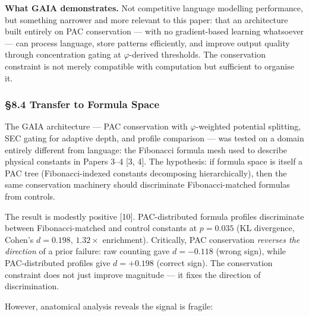 \documentclass[
  11pt,
  a4paper]{article}
\begin{document}
\textbf{What GAIA demonstrates.} Not competitive language modelling
performance, but something narrower and more relevant to this paper:
that an architecture built entirely on PAC conservation --- with no
gradient-based learning whatsoever --- can process language, store
patterns efficiently, and improve output quality through concentration
gating at \(\varphi\)-derived thresholds. The conservation constraint is
not merely compatible with computation but sufficient to organise it.

\subsubsection{§8.4 Transfer to Formula
Space}\label{transfer-to-formula-space}

The GAIA architecture --- PAC conservation with \(\varphi\)-weighted
potential splitting, SEC gating for adaptive depth, and profile
comparison --- was tested on a domain entirely different from language:
the Fibonacci formula mesh used to describe physical constants in Papers
3--4 {[}3, 4{]}. The hypothesis: if formula space is itself a PAC tree
(Fibonacci-indexed constants decomposing hierarchically), then the same
conservation machinery should discriminate Fibonacci-matched formulas
from controls.

The result is modestly positive {[}10{]}. PAC-distributed formula
profiles discriminate between Fibonacci-matched and control constants at
\(p = 0.035\) (KL divergence, Cohen's \(d = 0.198\), \(1.32\times\)
enrichment). Critically, PAC conservation \emph{reverses the direction}
of a prior failure: raw counting gave \(d = -0.118\) (wrong sign), while
PAC-distributed profiles give \(d = +0.198\) (correct sign). The
conservation constraint does not just improve magnitude --- it fixes the
direction of discrimination.

However, anatomical analysis reveals the signal is fragile:
\end{document}
